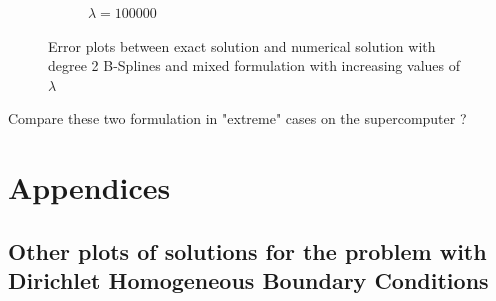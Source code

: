 \documentclass[a4paper,12pt,twoside]{report}
\begin{document}
\begin{figure}[!h]
\begin{subfigure}[b]{0.49\textwidth}
		\caption{$\lambda=100000$}
	\end{subfigure}
	\caption{Error plots between exact solution and numerical solution with degree 2 B-Splines and mixed formulation with increasing values of $\lambda$}
\end{figure}

\newpage
Compare these two formulation in "extreme" cases on the supercomputer ?

\newpage
\printbibliography[heading=bibnumbered]

\newpage
\chapter{Appendices}
\section{Other plots of solutions for the problem with Dirichlet Homogeneous Boundary Conditions}
\end{document}
